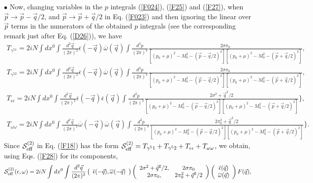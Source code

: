 \documentclass[12pt,a4paper]{article}
\begin{document}
$\bullet$ Now, changing variables in the $p$ integrals (\ref{F024}), (\ref{F25}) and
(\ref{F27}), when $\vec p\to\vec p-\vec q/2$, and $\vec p\to \vec p+\vec q/2$ in Eq.
(\ref{F023}) and then ignoring the linear over $\vec p$ terms in the numerators of the obtained
$p$ integrals (see the corresponding remark just after Eq. (\ref{D26})), we have
\begin{eqnarray}
T_{\gamma^51}=2iN\int dx^0\int \frac{d^2\vec q}{(2\pi)^2}\overline \epsilon (-\vec q)
\overline \omega (\vec q)\int
\frac{d^3p}{(2\pi)^3}
\frac{2\sigma\pi_0}{[(p_0+\mu)^2-M_0^2-(\vec p-\vec q/2)^2][(p_0+\mu)^2-M_0^2-(\vec p+\vec q/2)^2]},\nonumber\\
T_{\gamma^52}=2iN\int dx^0\int \frac{d^2\vec q}{(2\pi)^2}\overline \epsilon (-\vec q)
\overline \omega (\vec q)\int
\frac{d^3p}{(2\pi)^3}
\frac{2\sigma\pi_0}{[(p_0+\mu)^2-M_0^2-(\vec p-\vec q/2)^2][(p_0+\mu)^2-M_0^2-(\vec p+\vec q/2)^2]},
\nonumber\\
T_{\epsilon\epsilon}
=2iN\int dx^0\int \frac{d^2\vec q}{(2\pi)^2}
\overline \epsilon (-\vec q)\overline \epsilon (\vec q)\int \frac{d^3p}{(2\pi)^3}
\frac{2\sigma^2+
\vec q^2/2}{[(p_0+\mu)^2-M_0^2-(\vec p-\vec q/2)^2][(p_0+\mu)^2-M_0^2-(\vec p+\vec q/2)^2]}
\Big\},\nonumber\\
T_{\omega\omega}=2iN\int dx^0\int \frac{d^2\vec q}{(2\pi)^2}
\overline \omega (-\vec q)\overline \omega (\vec q)\int \frac{d^3p}{(2\pi)^3}\frac{2\pi_0^2+
\vec q^2/2}{[(p_0+\mu)^2-M_0^2-(\vec p-\vec q/2)^2][(p_0+\mu)^2-M_0^2-(\vec p+\vec q/2)^2]}
\Big\}.
\label{F28}
\end{eqnarray}
Since ${\cal S}^{(2)}_{\rm {eff}}$ in Eq. (\ref{F18}) has the form ${\cal S}^{(2)}_{\rm {eff}}=T_{\gamma^51}+
T_{\gamma^52}+T_{\epsilon\epsilon}+T_{\omega\omega}$, we obtain, using Eqs. (\ref{F28}) for its components,
\begin{eqnarray}
{\cal S}^{(2)}_{\rm {eff}}(\epsilon,\omega)=2iN\int dx^0\int \frac{d^2\vec q}{(2\pi)^2}
\left (\begin{array}{c}
\overline \epsilon (-\vec q),
\overline \omega (-\vec q)
\end{array}\right )\left (\begin{array}{cc}
2\sigma^2+
\vec q^2/2,& 2\sigma\pi_0\\
2\sigma\pi_0,& 2\pi_0^2+\vec q^2/2
\end{array}\right )
\left (\begin{array}{cc}
\overline \epsilon (\vec q)\\
\overline \omega (\vec q)
\end{array}\right )F(\vec q),
\label{F29}
\end{eqnarray}
\end{document}
